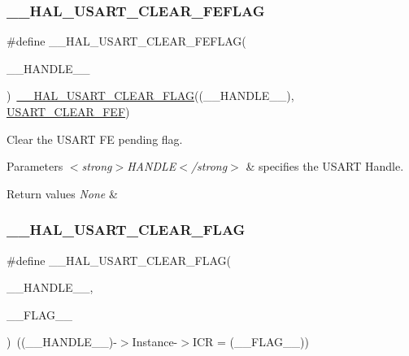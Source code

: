 \subsubsection{\texorpdfstring{\+\_\+\+\_\+\+H\+A\+L\+\_\+\+U\+S\+A\+R\+T\+\_\+\+C\+L\+E\+A\+R\+\_\+\+F\+E\+F\+L\+AG}{\_\_HAL\_USART\_CLEAR\_FEFLAG}}
{\footnotesize\ttfamily \#define \+\_\+\+\_\+\+H\+A\+L\+\_\+\+U\+S\+A\+R\+T\+\_\+\+C\+L\+E\+A\+R\+\_\+\+F\+E\+F\+L\+AG(\begin{DoxyParamCaption}\item[{}]{\+\_\+\+\_\+\+H\+A\+N\+D\+L\+E\+\_\+\+\_\+ }\end{DoxyParamCaption})~\hyperlink{group___u_s_a_r_t___exported___macros_gaff3cb6ff740b240764e7844eaf3d6807}{\+\_\+\+\_\+\+H\+A\+L\+\_\+\+U\+S\+A\+R\+T\+\_\+\+C\+L\+E\+A\+R\+\_\+\+F\+L\+AG}((\+\_\+\+\_\+\+H\+A\+N\+D\+L\+E\+\_\+\+\_\+), \hyperlink{group___u_s_a_r_t___i_t___c_l_e_a_r___flags_ga9aa038b779783f685fbc834ebf4c3077}{U\+S\+A\+R\+T\+\_\+\+C\+L\+E\+A\+R\+\_\+\+F\+EF})}



Clear the U\+S\+A\+RT FE pending flag. 


\begin{DoxyParams}{Parameters}
{\em $<$strong$>$\+H\+A\+N\+D\+L\+E$<$/strong$>$} & specifies the U\+S\+A\+RT Handle. \\
\hline
\end{DoxyParams}

\begin{DoxyRetVals}{Return values}
{\em None} & \\
\hline
\end{DoxyRetVals}
\mbox{\label{group___u_s_a_r_t___exported___macros_gaff3cb6ff740b240764e7844eaf3d6807}} 
\subsubsection{\texorpdfstring{\+\_\+\+\_\+\+H\+A\+L\+\_\+\+U\+S\+A\+R\+T\+\_\+\+C\+L\+E\+A\+R\+\_\+\+F\+L\+AG}{\_\_HAL\_USART\_CLEAR\_FLAG}}
{\footnotesize\ttfamily \#define \+\_\+\+\_\+\+H\+A\+L\+\_\+\+U\+S\+A\+R\+T\+\_\+\+C\+L\+E\+A\+R\+\_\+\+F\+L\+AG(\begin{DoxyParamCaption}\item[{}]{\+\_\+\+\_\+\+H\+A\+N\+D\+L\+E\+\_\+\+\_\+,  }\item[{}]{\+\_\+\+\_\+\+F\+L\+A\+G\+\_\+\+\_\+ }\end{DoxyParamCaption})~((\+\_\+\+\_\+\+H\+A\+N\+D\+L\+E\+\_\+\+\_\+)-\/$>$Instance-\/$>$I\+CR = (\+\_\+\+\_\+\+F\+L\+A\+G\+\_\+\+\_\+))}



